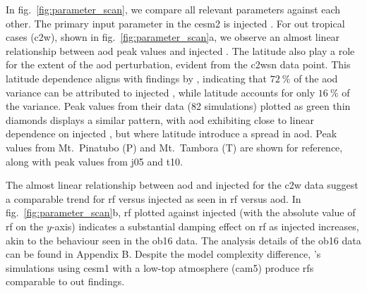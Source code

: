 \documentclass{ametsocV6.1}
\newcommand{\iso}[1][i]{{#1}njected \ce{SO2}}
\begin{document}
In fig.~\ref{fig:parameter_scan}, we compare all relevant parameters against each other.
The primary input parameter in the \gls{cesm2} is \iso{}. For out tropical cases
(\gls{c2w}), shown in fig.~\ref{fig:parameter_scan}a, we observe an almost linear
relationship between \gls{aod} peak values and \iso{}. The latitude also play a role for
the extent of the \gls{aod} perturbation, evident from the \gls{c2wsn} data point. This
latitude dependence aligns with findings by \citet{marshall2019}, indicating that
\(\SI{72}{\percent}\) of the \gls{aod} variance can be attributed to \iso{}, while
latitude accounts for only \(\SI{16}{\percent}\) of the variance. Peak values from their
data (82 simulations) plotted as green thin diamonds displays a similar pattern, with
\gls{aod} exhibiting close to linear dependence on \iso{}, but where latitude introduce
a spread in \gls{aod}. Peak values from Mt.\ Pinatubo (P) and Mt.\ Tambora (T) are shown
for reference, along with peak values from \gls{j05} and \gls{t10}.

The almost linear relationship between \gls{aod} and \iso{} for the \gls{c2w} data
suggest a comparable trend for \gls{rf} versus \iso{} as seen in \gls{rf} versus
\gls{aod}. In fig.~\ref{fig:parameter_scan}b, \gls{rf} plotted against \iso{} (with the
absolute value of \gls{rf} on the \(y\)-axis) indicates a substantial damping effect on
\gls{rf} as \iso{} increases, akin to the behaviour seen in the \gls{ob16} data. The
analysis details of the \gls{ob16} data can be found in Appendix B. Despite the model
complexity difference, \citet{ottobliesner2016}'s simulations using \gls{cesm1} with a
low-top atmosphere (\gls{cam5}) produce \glspl{rf} comparable to out findings.
\end{document}
